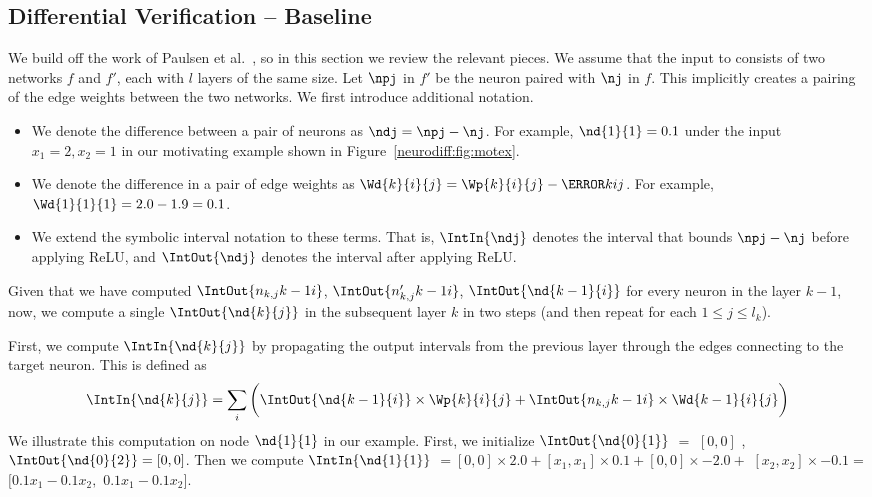 \subsection{Differential Verification -- Baseline}
\label{neurodiff:sec:baseline}

We build off the work of Paulsen et al.~\cite{paulsen2020reludiff}, so in this
section
we review the relevant pieces. We assume that the input
to \Name{} consists of two networks $ f $ and $ f' $, each with $ l $ layers
of the same size.  Let $ \npj $ in $ f' $ be the neuron paired with
$ \nj $ in $ f $. This implicitly creates a pairing of the edge
weights between the two networks. We first introduce additional notation.
%
\begin{itemize}
\item
We denote the difference between a pair of neurons as $ \ndj = \npj
- \nj $. For example, $ \nd{1}{1} = 0.1 $ under the input $ x_1 = 2, x_2 =
1 $ in our motivating example shown in Figure~\ref{neurodiff:fig:motex}.
\item
We denote the difference in a pair of edge weights as $ \Wd{k}{i}{j}
= \Wp{k}{i}{j} - \W{k}{i}{j} $. For example, $ \Wd{1}{1}{1} = 2.0 -
1.9 = 0.1 $.
\item
We extend the symbolic interval notation to these terms. That is,
$ \IntIn{\ndj} $ denotes the interval that bounds $ \npj - \nj $
before applying ReLU, and $ \IntOut{\ndj} $ denotes the interval after
applying ReLU.
\end{itemize}

Given that we have computed $ \IntOut{\n{k-1}{i}}$,
$\IntOut{\np{k-1}{i}}$, $\IntOut{\nd{k-1}{i}} $ for every neuron in
the layer $ k - 1 $, now, we compute a single $ \IntOut{\nd{k}{j}} $
in the subsequent layer $k$ in two steps (and then repeat for each $ 1 \leq
j \leq l_k $).

First, we compute $ \IntIn{\nd{k}{j}} $ by propagating the output
intervals from the previous layer through the edges connecting to the
target neuron. This is defined as
%
\[
	\IntIn{\nd{k}{j}} = \sum_{i} \bigg( \IntOut{\nd{k-1}{i}} \times \Wp{k}{i}{j} + \IntOut{\n{k-1}{i}} \times \Wd{k-1}{i}{j} \bigg)
\]
%
We illustrate this computation on node $ \nd{1}{1} $ in our
example. First, we initialize $ \IntOut{\nd{0}{1}} $  $ = $  $ [0,0] $ ,
$\IntOut{\nd{0}{2}} = [0,0]$. Then we compute $ \IntIn{\nd{1}{1}} $  $ =
[0, 0] \times 2.0 +$$ [x_1, x_1] \times 0.1 + $$ [0, 0] \times -2.0 +
$ $ [x_2, x_2] \times -0.1 = $ $[0.1x_1 - 0.1x_2,$ $ 0.1x_1 - 0.1x_2]
$.

